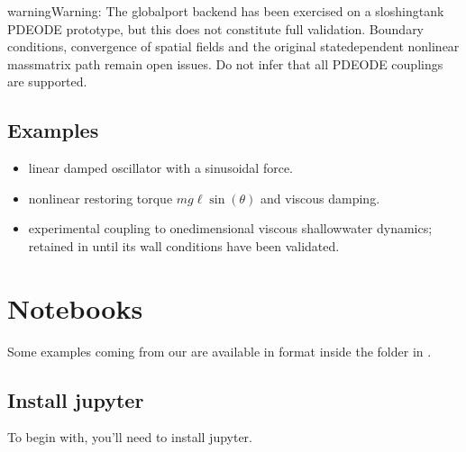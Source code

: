\documentclass[letterpaper,10pt,english]{sphinxmanual}
\begin{document}
\begin{sphinxadmonition}{warning}{Warning:}
\sphinxAtStartPar
The global\sphinxhyphen{}port backend has been exercised on a sloshing\sphinxhyphen{}tank
PDE\textendash{}ODE prototype, but this does not constitute full validation.
Boundary conditions, convergence of spatial fields and the
original state\sphinxhyphen{}dependent nonlinear mass\sphinxhyphen{}matrix path remain open
issues. Do not infer that all PDE\textendash{}ODE couplings are supported.
\end{sphinxadmonition}


\subsection{Examples}
\label{\detokenize{lumped:examples}}\begin{itemize}
\item {} 
\sphinxAtStartPar
{\hyperref[\detokenize{examples/mass_spring_damper::doc}]{}} \textendash{} linear damped oscillator with a
sinusoidal force.

\item {} 
\sphinxAtStartPar
{\hyperref[\detokenize{examples/nonlinear_pendulum::doc}]{}} \textendash{} nonlinear restoring torque
\(mg\ell\sin(\theta)\) and viscous damping.

\item {} 
\sphinxAtStartPar
{} \textendash{} experimental coupling to one\sphinxhyphen{}dimensional
viscous shallow\sphinxhyphen{}water dynamics; retained in  until its
wall conditions have been validated.

\end{itemize}

\sphinxstepscope


\section{Notebooks}
\label{\detokenize{notebooks:notebooks}}\label{\detokenize{notebooks::doc}}\label{\detokenize{notebooks:id1}}
\sphinxAtStartPar
Some examples coming from our  are available in  format inside the  folder in .


\subsection{Install jupyter}
\label{\detokenize{notebooks:install-jupyter}}
\sphinxAtStartPar
To begin with, you’ll need to install jupyter.
\end{document}
